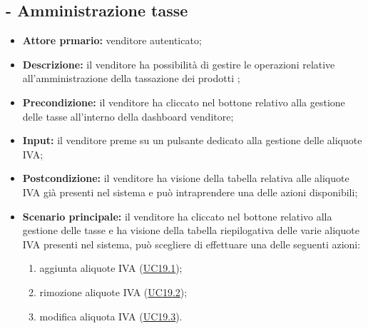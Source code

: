 \subsection{ - Amministrazione tasse}
\begin{itemize}
    \item \textbf{Attore prmario:} venditore autenticato;
    \item \textbf{Descrizione:} il venditore ha possibilità di gestire le operazioni relative all’amministrazione della tassazione dei prodotti ;
    \item \textbf{Precondizione:} il venditore ha cliccato nel bottone relativo alla gestione delle tasse all’interno della dashboard venditore;
    \item \textbf{Input:} il venditore preme su un pulsante dedicato alla gestione delle aliquote IVA;
    \item \textbf{Postcondizione:} il venditore ha visione della tabella relativa alle aliquote IVA già presenti nel sistema e può intraprendere una delle azioni disponibili;
    \item \textbf{Scenario principale:} il venditore ha cliccato nel bottone relativo alla gestione delle tasse e ha visione della tabella riepilogativa delle varie aliquote IVA presenti nel sistema, può scegliere di effettuare una delle seguenti azioni:
          \begin{enumerate}
              \item aggiunta aliquote IVA (\hyperref[UC19.1]{UC19.1});
              \item rimozione aliquote IVA (\hyperref[UC19.2]{UC19.2});
              \item modifica aliquota IVA (\hyperref[UC19.3]{UC19.3}).
          \end{enumerate}
\end{itemize}

\stepsubUserCase

